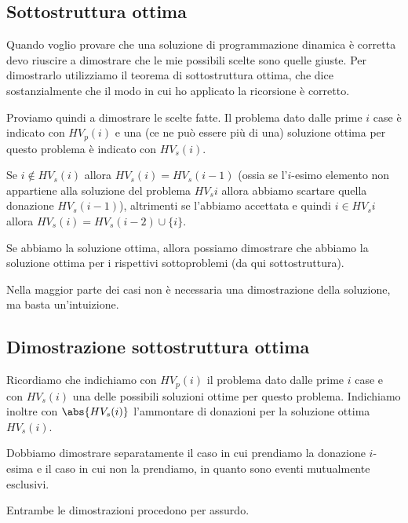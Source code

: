 \subsection*{Sottostruttura ottima}

Quando voglio provare che una soluzione di programmazione dinamica è corretta devo riuscire a dimostrare che le mie possibili scelte sono quelle giuste.
Per dimostrarlo utilizziamo il teorema di sottostruttura ottima, che dice sostanzialmente che il modo in cui ho applicato la ricorsione è corretto.

Proviamo quindi a dimostrare le scelte fatte.
Il problema dato dalle prime \(i\) case è indicato con \(HV_{p}(i)\) e una (ce ne può essere più di una) soluzione ottima per questo problema è indicato con \(HV_{s}(i)\).

Se \(i \not\in HV_{s}(i)\) allora \(HV_{s}(i) = HV_{s}(i-1)\) (ossia se l'\(i\)-esimo elemento non appartiene alla soluzione del problema \(HV_{s}i\) allora abbiamo scartare quella donazione \(HV_{s}(i-1)\)), altrimenti se l'abbiamo accettata e quindi \(i \in HV_{s}i\) allora \(HV_{s}(i) = HV_{s}(i-2) \cup \{i\}\).

Se abbiamo la soluzione ottima, allora possiamo dimostrare che abbiamo la soluzione ottima per i rispettivi sottoproblemi (da qui sottostruttura).

\begin{note}
Nella maggior parte dei casi non è necessaria una dimostrazione della soluzione, ma basta un'intuizione.
\end{note}

\subsection{Dimostrazione sottostruttura ottima}

Ricordiamo che indichiamo con \(HV_{p}(i)\) il problema dato dalle prime \(i\) case e con \(HV_{s}(i)\) una delle possibili soluzioni ottime per questo problema.
Indichiamo inoltre con \(\abs{HV_{s}(i)}\) l'ammontare di donazioni per la soluzione ottima \(HV_{s}(i)\).

\begin{note}
Dobbiamo dimostrare separatamente il caso in cui prendiamo la donazione \(i\)-esima e il caso in cui non la prendiamo, in quanto sono eventi mutualmente esclusivi.
\end{note}

Entrambe le dimostrazioni procedono per assurdo.

